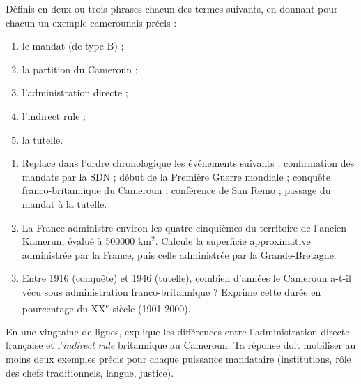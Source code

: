 \documentclass[11pt]{article}
\newcommand{\cle}[1]{{\popxbold\color{popdark}#1}}
\newcounter{popsec}
\newcounter{popsub}
\newcommand{\courssub}[1]{%
  \stepcounter{popsub}%
  \par\vspace{9pt}\noindent{\popxbold\fontsize{11.5}{13}\selectfont\color{popink}{\color{poporange}\thepopsec.\thepopsub}\hspace{6pt}#1}\par\nopagebreak\vspace{4pt}
}
\begin{document}
\begin{exercice}[Définitions]
Définis en deux ou trois phrases chacun des termes suivants, en donnant pour chacun un exemple camerounais précis :
\begin{enumerate}
\item le \cle{mandat} (de type B) ;
\item la \cle{partition} du Cameroun ;
\item l'\cle{administration directe} ;
\item l'\cle{indirect rule} ;
\item la \cle{tutelle}.
\end{enumerate}
\end{exercice}

\begin{exercice}
\begin{enumerate}
\item Replace dans l'ordre chronologique les événements suivants : confirmation des mandats par la SDN ; début de la Première Guerre mondiale ; conquête franco-britannique du Cameroun ; conférence de San Remo ; passage du mandat à la tutelle.
\item La France administre environ les quatre cinquièmes du territoire de l'ancien Kamerun, évalué à \num{500000} km$^2$. Calcule la superficie approximative administrée par la France, puis celle administrée par la Grande-Bretagne.
\item Entre 1916 (conquête) et 1946 (tutelle), combien d'années le Cameroun a-t-il vécu sous administration franco-britannique ? Exprime cette durée en pourcentage du XX\textsuperscript{e} siècle (1901-2000).
\end{enumerate}
\end{exercice}

\courssub{Je m'entraîne}

\begin{exercice}
En une vingtaine de lignes, explique les différences entre l'administration directe française et l'\emph{indirect rule} britannique au Cameroun. Ta réponse doit mobiliser au moins deux exemples précis pour chaque puissance mandataire (institutions, rôle des chefs traditionnels, langue, justice).
\end{exercice}
\end{document}
